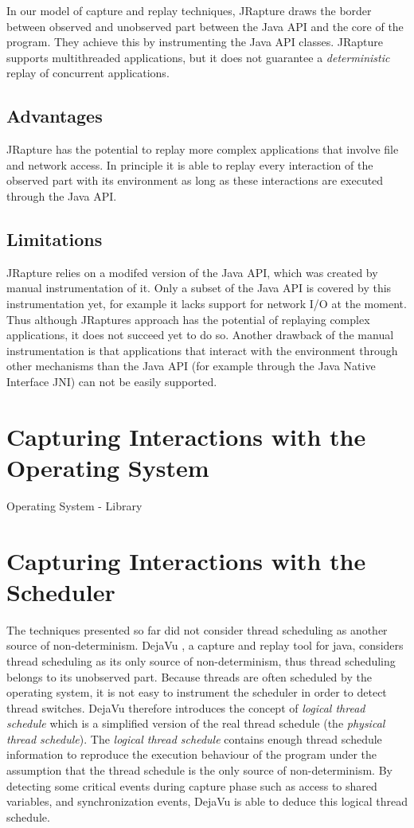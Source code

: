 In our model of capture and replay techniques, JRapture draws the border between observed and unobserved part between the Java API and the core of the program. They achieve this by instrumenting the Java API classes. JRapture supports multithreaded applications, but it does not guarantee a \emph{deterministic} replay of concurrent applications.

\subsection{Advantages}
JRapture has the potential to replay more complex applications that involve file and network access. In principle it is able to replay every interaction of the observed part with its environment as long as these interactions are executed through the Java API.
\subsection{Limitations}
JRapture relies on a modifed version of the Java API, which was created by manual instrumentation of it. Only a subset of the Java API is covered by this instrumentation yet, for example it lacks support for network I/O at the moment. Thus although JRaptures approach has the potential of replaying complex applications, it does not succeed yet to do so. Another drawback of the manual instrumentation is that applications that interact with the environment through other mechanisms than the Java API (for example through the Java Native Interface JNI) can not be easily supported.
\section {Capturing Interactions with the Operating System}
Operating System - Library
\section {Capturing Interactions with the Scheduler}
The techniques presented so far did not consider thread scheduling as another source of non-determinism. DejaVu \cite{dejavu}, a capture and replay tool for java, considers thread scheduling as its only source of non-determinism, thus thread scheduling belongs to its unobserved part. Because threads are often scheduled by the operating system, it is not easy to instrument the scheduler in order to detect thread switches. DejaVu therefore introduces the concept of \emph{logical thread schedule} which is a simplified version of the real thread schedule (the \emph{physical thread schedule}). The \emph{logical thread schedule} contains enough thread schedule information to reproduce the execution behaviour of the program under the assumption that the thread schedule is the only source of non-determinism. By detecting some critical events during capture phase such as access to shared variables, and synchronization events, DejaVu is able to deduce this logical thread schedule.

